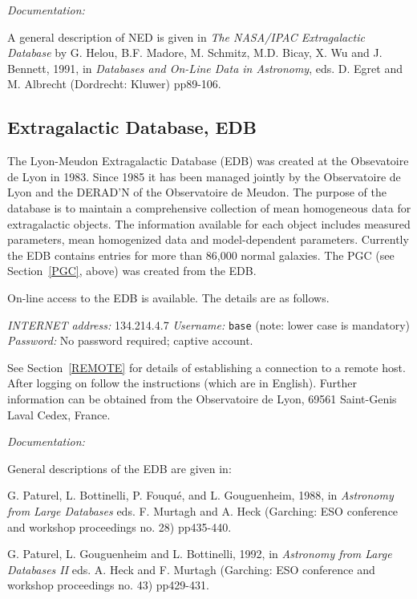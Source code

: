 \documentclass[twoside,11pt,nolof]{starlink}
\begin{document}
\textit{Documentation:}

A general description of NED is given in \textit{The NASA/IPAC
Extragalactic Database} by G. Helou, B.F. Madore, M. Schmitz, M.D.
Bicay, X. Wu and J. Bennett, 1991, in \textit{Databases and On-Line Data in
Astronomy}, eds. D. Egret and M. Albrecht (Dordrecht: Kluwer) pp89-106.

\subsection{Extragalactic Database, EDB
\label{EDB}}

The Lyon-Meudon Extragalactic Database (EDB) was created at the
Obsevatoire de Lyon in 1983. Since 1985 it has been managed jointly by
the Observatoire de Lyon and the DERAD'N of the Observatoire de Meudon.
The purpose of the database is to maintain a comprehensive collection
of mean homogeneous data for extragalactic objects. The information
available for each object includes measured parameters, mean homogenized
data and model-dependent parameters. Currently the EDB contains entries
for more than 86,000 normal galaxies. The PGC (see Section~\ref{PGC},
above) was created from the EDB.

On-line access to the EDB is available. The details are as follows.

\textit{INTERNET address:} 134.214.4.7
\newline \textit{Username:} \verb-base- (note: lower case is mandatory)
\newline \textit{Password:} No password required; captive account.

See Section~\ref{REMOTE} for details of establishing a connection to
a remote host. After logging on follow the instructions (which are in
English). Further information can be obtained from the Observatoire de
Lyon, 69561 Saint-Genis Laval Cedex, France.

\textit{Documentation:}

General descriptions of the EDB are given in:

G. Paturel, L. Bottinelli, P. Fouqu\'{e}, and L. Gouguenheim, 1988, in
\textit{Astronomy from Large Databases} eds. F. Murtagh and A. Heck
(Garching: ESO conference and workshop proceedings no. 28) pp435-440.

G. Paturel, L. Gouguenheim and L. Bottinelli, 1992, in
\textit{Astronomy from Large Databases II} eds. A. Heck and F. Murtagh
(Garching: ESO conference and workshop proceedings no. 43) pp429-431.
\end{document}
